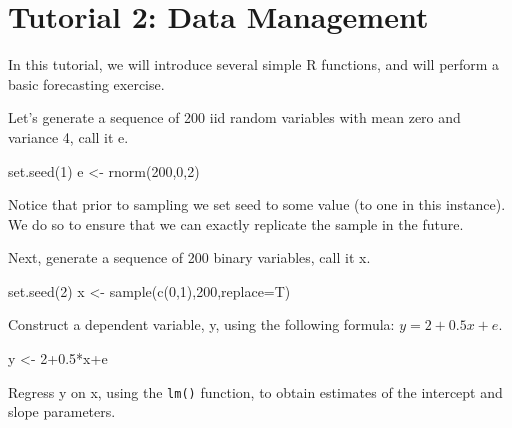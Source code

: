 \documentclass[
  12pt,
  oneside]{book}
\newenvironment{Shaded}{\begin{snugshade}}{\end{snugshade}}
\newcommand{\AttributeTok}[1]{\textcolor[rgb]{0.77,0.63,0.00}{#1}}
\newcommand{\DecValTok}[1]{\textcolor[rgb]{0.00,0.00,0.81}{#1}}
\newcommand{\FloatTok}[1]{\textcolor[rgb]{0.00,0.00,0.81}{#1}}
\newcommand{\FunctionTok}[1]{\textcolor[rgb]{0.00,0.00,0.00}{#1}}
\newcommand{\NormalTok}[1]{#1}
\newcommand{\OtherTok}[1]{\textcolor[rgb]{0.56,0.35,0.01}{#1}}
\newcommand{\SpecialCharTok}[1]{\textcolor[rgb]{0.00,0.00,0.00}{#1}}
\begin{document}
\hypertarget{tutorial-2-data-management}{%
\chapter*{Tutorial 2: Data Management}\label{tutorial-2-data-management}}

In this tutorial, we will introduce several simple R functions, and will perform a basic forecasting exercise.

Let's generate a sequence of 200 iid random variables with mean zero and variance 4, call it e.

\begin{Shaded}
\begin{Highlighting}[]
\FunctionTok{set.seed}\NormalTok{(}\DecValTok{1}\NormalTok{)}
\NormalTok{e }\OtherTok{\textless{}{-}} \FunctionTok{rnorm}\NormalTok{(}\DecValTok{200}\NormalTok{,}\DecValTok{0}\NormalTok{,}\DecValTok{2}\NormalTok{)}
\end{Highlighting}
\end{Shaded}

Notice that prior to sampling we set seed to some value (to one in this instance). We do so to ensure that we can exactly replicate the sample in the future.

Next, generate a sequence of 200 binary variables, call it x.

\begin{Shaded}
\begin{Highlighting}[]
\FunctionTok{set.seed}\NormalTok{(}\DecValTok{2}\NormalTok{)}
\NormalTok{x }\OtherTok{\textless{}{-}} \FunctionTok{sample}\NormalTok{(}\FunctionTok{c}\NormalTok{(}\DecValTok{0}\NormalTok{,}\DecValTok{1}\NormalTok{),}\DecValTok{200}\NormalTok{,}\AttributeTok{replace=}\NormalTok{T)}
\end{Highlighting}
\end{Shaded}

Construct a dependent variable, y, using the following formula: \(y=2+0.5x+e\).

\begin{Shaded}
\begin{Highlighting}[]
\NormalTok{y }\OtherTok{\textless{}{-}} \DecValTok{2}\FloatTok{+0.5}\SpecialCharTok{*}\NormalTok{x}\SpecialCharTok{+}\NormalTok{e}
\end{Highlighting}
\end{Shaded}

Regress y on x, using the \texttt{lm()} function, to obtain estimates of the intercept and slope parameters.
\end{document}
